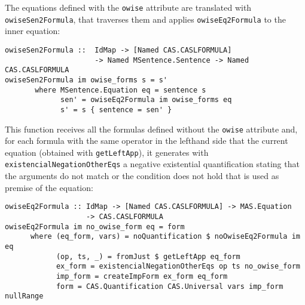 The equations defined with the \verb"owise" attribute are translated
with \verb"owiseSen2Formula", that traverses them and applies
\verb"owiseEq2Formula" to the inner equation:

{\codesize
\begin{verbatim}
owiseSen2Formula ::  IdMap -> [Named CAS.CASLFORMULA]
                     -> Named MSentence.Sentence -> Named CAS.CASLFORMULA
owiseSen2Formula im owise_forms s = s'
       where MSentence.Equation eq = sentence s
             sen' = owiseEq2Formula im owise_forms eq
             s' = s { sentence = sen' }
\end{verbatim}
}

This function receives all the formulas defined without the \verb"owise"
attribute and, for each formula with the same operator in the lefthand
side that the current equation (obtained with \verb"getLeftApp"), it
generates with \verb"existencialNegationOtherEqs" a negative existential
quantification stating that the arguments do not match or the condition
does not hold that is used as premise of the equation:

{\codesize
\begin{verbatim}
owiseEq2Formula :: IdMap -> [Named CAS.CASLFORMULA] -> MAS.Equation
                   -> CAS.CASLFORMULA
owiseEq2Formula im no_owise_form eq = form
      where (eq_form, vars) = noQuantification $ noOwiseEq2Formula im eq
            (op, ts, _) = fromJust $ getLeftApp eq_form
            ex_form = existencialNegationOtherEqs op ts no_owise_form
            imp_form = createImpForm ex_form eq_form
            form = CAS.Quantification CAS.Universal vars imp_form nullRange
\end{verbatim}
}



